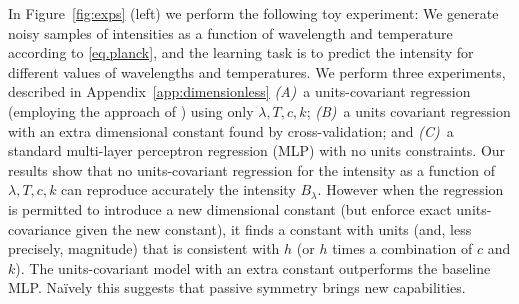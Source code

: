\documentclass[]{article} %
\newcommand{\figref}[1]{Figure~\ref{#1}}
\begin{document}
In \figref{fig:exps} (left) we perform the following toy experiment:
We generate noisy samples of intensities as a function of wavelength and temperature according to \eqref{eq.planck}, and the learning task is to predict the intensity for different values of wavelengths and temperatures.
We perform three experiments, described in Appendix~\ref{app:dimensionless}
\textsl{(A)}~a units-covariant regression (employing the approach of \citealt{villar2022dimensionless}) using only $\lambda, T, c, k$; \textsl{(B)}~a units covariant regression with an extra dimensional constant found by cross-validation; and \textsl{(C)}~a standard multi-layer perceptron regression (MLP) with no units constraints.
Our results show that no units-covariant regression for the intensity as a function of $\lambda, T, c, k$ can reproduce accurately the intensity $B_\lambda$.
However when the regression is permitted to introduce a new dimensional constant (but enforce exact units-covariance given the new constant), it finds a constant with units (and, less precisely, magnitude) that is consistent with $h$ (or $h$ times a combination of $c$ and $k$).
The units-covariant model with an extra constant outperforms the baseline MLP.
Na\"ively this suggests that passive symmetry brings new capabilities.
\end{document}
